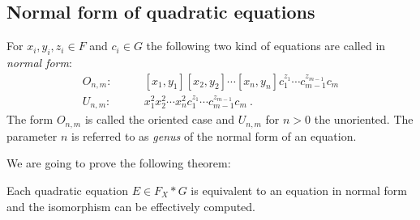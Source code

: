 \documentclass[a4paper,12pt]{article}
\begin{document}
\subsection{Normal form of quadratic equations} \label{sec:normal_form}
\begin{defi}
 For $x_i,y_i,z_i \in F$ and $c_i \in G$ the following two kind of equations are called in \emph{normal form}:
 \begin{align}
  O_{n,m}:\qquad & [x_1,y_1][x_2,y_2]\cdots[x_n,y_n]c_1^{z_1}\cdots c_{m-1}^{z_{m-1}}c_m  \\
   U_{n,m}:\qquad & x_1^2x_2^2\cdots x_n^2 c_1^{z_1}\cdots c_{m-1}^{z_{m-1}}c_m\ .
 \end{align} 
 The form $O_{n,m}$ is called the oriented case and $U_{n,m}$ for $n>0$ the unoriented.
  The parameter $n$ is referred to as \emph{genus} of the normal form of an equation. 
\end{defi}
We are going to prove the following theorem:
\begin{thm} \label{Thm:equationNormalForm}
 Each quadratic equation $E \in F_X*G$ is equivalent to an equation in normal form and the 
 isomorphism can be effectively computed.
\end{thm}
\end{document}
